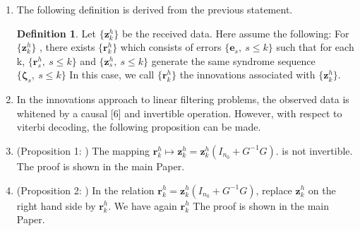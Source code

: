\documentclass[fontsize=12pt]{article}
\theoremstyle{definition}
\newtheorem{definition}{Definition}
\begin{document}
\begin{enumerate}
\item The following definition is derived from the previous statement. 

\begin{definition}
Let $\{\mathbf{z}_k^h\}$ be the received data. Here assume
the following: For $\{\mathbf{z}_k^h\}$
, there exists  $\{\mathbf{r}_k^h\}$
which consists of errors
$\{\mathbf{e}_s,~s \leq k\} $ such that for each k,  $\{\mathbf{r}_s^h,~s \leq k\} $ and $\{\mathbf{z}_s^h,~s \leq k\} $ generate the same syndrome sequence $\{\mathbf{\zeta}_s,~s \leq k\} $ In this
case, we call  $\{\mathbf{r}_k^h\}$ the innovations associated with  $\{\mathbf{z}_k^h\}$.
\end{definition}

\item In the innovations
approach to linear filtering problems, the observed data is
whitened by a causal [6] and invertible operation. However, with respect to viterbi decoding, the following proposition can be made.

\item (Proposition 1: ) The mapping  $\mathbf{r}_k^h  \mapsto \mathbf{z}_k^h = \mathbf{z}_k^h( I_{n_0} + G^{-1}G ) $. is not invertible. The proof is shown in the main Paper.

\item (Proposition 2: ) In the relation   $\mathbf{r}_k^h=  \mathbf{z}_k^h( I_{n_0} + G^{-1}G ) $, replace $\mathbf{z}_k^h$ on the right hand side by $\mathbf{r}_k^h$. We have again $\mathbf{r}_k^h$ The proof is shown in the main Paper.

\end{enumerate}
\end{document}
